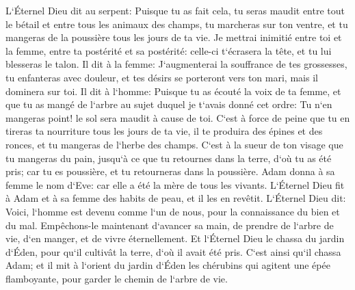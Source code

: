 \verse L`Éternel Dieu dit au serpent: Puisque tu as fait cela, tu seras maudit entre tout le bétail et entre tous les animaux des champs, tu marcheras sur ton ventre, et tu mangeras de la poussière tous les jours de ta vie. 
\verse Je mettrai inimitié entre toi et la femme, entre ta postérité et sa postérité: celle-ci t`écrasera la tête, et tu lui blesseras le talon. 
\verse Il dit à la femme: J`augmenterai la souffrance de tes grossesses, tu enfanteras avec douleur, et tes désirs se porteront vers ton mari, mais il dominera sur toi. 
\verse Il dit à l`homme: Puisque tu as écouté la voix de ta femme, et que tu as mangé de l`arbre au sujet duquel je t`avais donné cet ordre: Tu n`en mangeras point! le sol sera maudit à cause de toi. C`est à force de peine que tu en tireras ta nourriture tous les jours de ta vie, 
\verse il te produira des épines et des ronces, et tu mangeras de l`herbe des champs. 
\verse C`est à la sueur de ton visage que tu mangeras du pain, jusqu`à ce que tu retournes dans la terre, d`où tu as été pris; car tu es poussière, et tu retourneras dans la poussière. 
\verse Adam donna à sa femme le nom d`Eve: car elle a été la mère de tous les vivants. 
\verse L`Éternel Dieu fit à Adam et à sa femme des habits de peau, et il les en revêtit. 
\verse L`Éternel Dieu dit: Voici, l`homme est devenu comme l`un de nous, pour la connaissance du bien et du mal. Empêchons-le maintenant d`avancer sa main, de prendre de l`arbre de vie, d`en manger, et de vivre éternellement. 
\verse Et l`Éternel Dieu le chassa du jardin d`Éden, pour qu`il cultivât la terre, d`où il avait été pris. 
\verse C`est ainsi qu`il chassa Adam; et il mit à l`orient du jardin d`Éden les chérubins qui agitent une épée flamboyante, pour garder le chemin de l`arbre de vie. 

